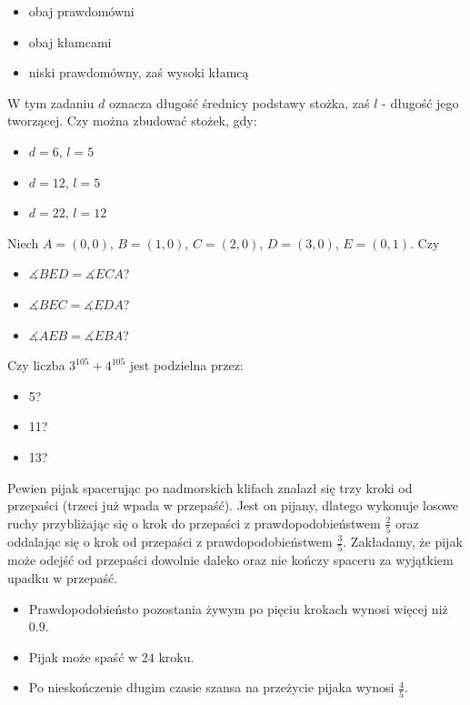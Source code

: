 \documentclass[12pt, a4paper]{article}
\newcommand{\question}[1]{\normalitem \begin{samepage}#1 \end{samepage}}
\newcommand{\questionwithasterix}[1]{ \asterixitem \begin{samepage}#1 \vspace{6cm}\end{samepage}}
\begin{document}
\begin{enumerate}
{        \begin{itemize}
			\item obaj prawdomówni
			\item obaj kłamcami
			\item niski prawdomówny, zaś wysoki kłamcą 
		\end{itemize}
	}
	
	\question {
		W tym zadaniu $d$ oznacza długość średnicy podstawy stożka, zaś $l$ - długość jego tworzącej. Czy można zbudować stożek, gdy:
		
		\begin{itemize}
			\item $d = 6$, $l = 5$ 
			\item $d = 12$, $l = 5$
			\item $d = 22$, $l = 12$
		\end{itemize}
	}
	
	\questionwithasterix{
		Niech $A=(0,0)$, $B=(1,0)$, $C=(2,0)$, $D=(3,0)$, $E=(0,1)$. Czy
	
		\begin{itemize}
			\item $\measuredangle BED = \measuredangle ECA$?
			\item $\measuredangle BEC = \measuredangle EDA$?
			\item $\measuredangle AEB = \measuredangle EBA$?
		\end{itemize}
	}
	
	\question {
		Czy liczba $3^{105} + 4^{105}$ jest podzielna przez:
		
		\begin{itemize}
			\item 5?
			\item 11?
			\item 13?
		\end{itemize}
	}
	
	\question {
		Pewien pijak spacerując po nadmorskich klifach znalazł się trzy kroki od przepaści (trzeci już wpada w przepaść). Jest on pijany, dlatego wykonuje losowe ruchy przybliżając się o krok do przepaści z prawdopodobieństwem
        $\frac{2}{5}$ oraz oddalając się o krok od przepaści z prawdopodobieństwem $\frac{3}{5}$. Zakładamy, że pijak może odejść od przepaści dowolnie daleko oraz nie kończy spaceru za wyjątkiem upadku w przepaść.

		\begin{itemize}
			\item Prawdopodobieństo pozostania żywym po pięciu krokach wynosi więcej niż $0.9$.
			\item Pijak może spaść w $24$ kroku.
			\item Po nieskończenie długim czasie szansa na przeżycie pijaka wynosi $\frac{4}{5}$.
		\end{itemize}
	}
	

\end{enumerate}
\end{document}
